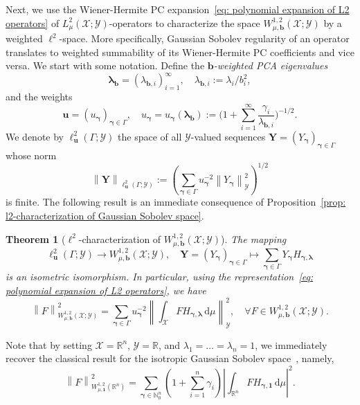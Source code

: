 \documentclass[namedate,webpdf]{ima-authoring-template-blank}
\def\D{\,\mathrm{d}}
\newcommand*{\nm}[1]{{\left\|#1\right \|}}
\newcommand{\abs}[1]{\left|#1\right|}
\newcounter{counter}
\numberwithin{counter}{section}
\numberwithin{equation}{section}
\theoremstyle{plain}
\newtheorem{theorem}[counter]{Theorem}
\theoremstyle{definition}
\newcommand*{\cX}{\mathcal{X}}
\newcommand*{\cY}{\mathcal{Y}}
\newcommand*{\bbN}{\mathbb{N}}
\newcommand*{\bbR}{\mathbb{R}}
\theoremstyle{thmstyletwo}
\begin{document}
Next, we use the Wiener-Hermite PC expansion~\eqref{eq: polynomial expansion of L2 operators} of \(L_{\mu}^2(\cX; \cY)\)-operators to characterize the space \(W_{\mu, \bm{b}}^{1,2}(\cX; \cY)\) by a weighted \(\ell^2\)-space.
More specifically, Gaussian Sobolev regularity of an operator translates to weighted summability of its Wiener-Hermite PC coefficients and vice versa. We start with some notation. 
Define the \emph{\(\bm{b}\)-weighted PCA eigenvalues} 
\begin{equation}
\label{eq: definition of lambda_b,i}
    \bm{\lambda_b} = (\lambda_{\bm{b}, i})_{i=1}^{\infty}, \quad \lambda_{\bm{b}, i} := \lambda_i / b_i^2,
\end{equation}
and the weights 
\begin{equation}
\label{eq: Sobolev weights}
    \bm{u}
    = (u_{\bm{\gamma}})_{\bm{\gamma} \in \Gamma}, \quad 
    u_{\bm{\gamma}} 
    = u_{\bm{\gamma}}(\bm{\lambda}_{\bm{b}})
    := \Bigg(1 + \sum_{i = 1}^{\infty} \frac{\gamma_i}{\lambda_{\bm{b},i}}\Bigg)^{-1/2}.
\end{equation}
We denote by \(\ell^2_{\bm{u}}(\Gamma; \cY) \) the space of all \(\cY\)-valued sequences \( \bm{Y} = (Y_{\bm{\gamma}})_{\bm{\gamma} \in \Gamma} \) whose norm 
\[
\nm{\bm{Y}}_{\ell^2_{\bm{u}}(\Gamma; \cY)} := \left( \sum_{\bm{\gamma} \in \Gamma}  u_{\bm{\gamma}}^{-2} \nm{Y_{\bm{\gamma}}}_{\cY}^2 \right)^{1/2}
\]
is finite.
The following result is an immediate consequence of Proposition~\ref{prop: l2-characterization of Gaussian Sobolev space}.

\begin{theorem}[{\(\ell^2\)-characterization of \(W_{\mu, \bm{b}}^{1,2}(\cX; \cY)\)}]
\label{thm: l2-characterization of Gaussian Sobolev space}
    The mapping 
    \[
    \ell_{\bm{u}}^2(\Gamma; \cY) \to W_{\mu, \bm{b}}^{1,2}(\cX; \cY), \quad \bm{Y} = (Y_{\bm{\gamma}})_{\bm{\gamma} \in \Gamma} \mapsto \sum_{\bm{\gamma} \in \Gamma} Y_{\bm{\gamma}} H_{\bm{\gamma}, \bm{\lambda}}
    \]
    is an isometric isomorphism. In particular, using the representation~\eqref{eq: polynomial expansion of L2 operators}, we have
    \[
    \nm{F}_{W_{\mu, \bm{b}}^{1,2}(\cX; \cY)}^2 = \sum_{\bm{\gamma }\in \Gamma} u_{\bm{\gamma}}^{-2} \nm{\int_{\cX} F H_{\bm{\gamma}, \bm{\lambda}} \D \mu}_{\cY}^2,
    \quad \forall F \in W_{\mu, \bm{b}}^{1, 2}(\cX; \cY).
    \]
\end{theorem}
Note that by setting \( \cX = \bbR^n \), \( \cY = \bbR \), and \( \lambda_1 = \dots = \lambda_n = 1 \), we immediately recover the classical result for the isotropic Gaussian Sobolev space~\citep{lopez_SobolevSpacesPotentialSpaces_2018}, namely,
\[
\nm{F}_{W^{1,2}_{\mu, \bm{1}}(\bbR^n)}^2 = \sum_{\bm{\gamma} \in \bbN_0^n} \left( 1 + \sum_{i = 1}^n \gamma_i \right) \abs{\int_{\bbR^n} F H_{\bm{\gamma}, \bm{1}} \D \mu}^2.
\]
\end{document}
